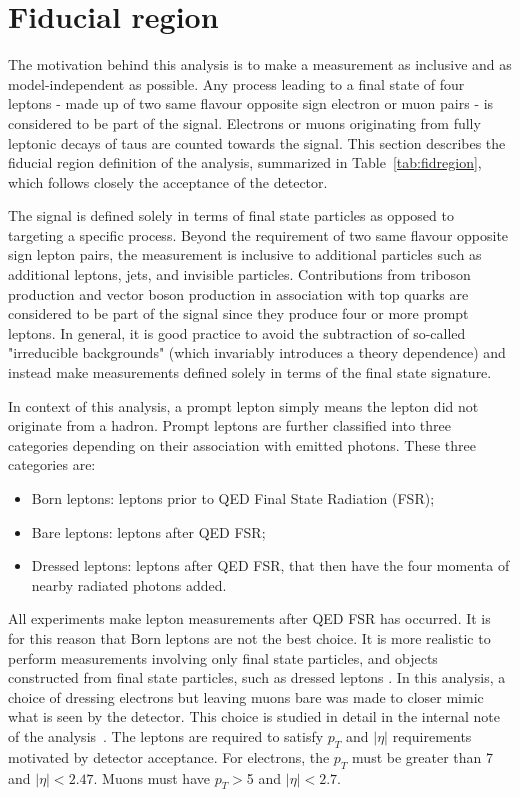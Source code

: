 \section{Fiducial region}
\label{sec:signaldef}
The motivation behind this analysis is to make a measurement as inclusive and as model-independent as possible. Any process leading to a final state of four leptons - made up of two same flavour opposite sign electron or muon pairs - is considered to be part of the signal. Electrons or muons originating from fully leptonic decays of taus are counted towards the signal. This section describes the fiducial region definition of the analysis, summarized in Table~\ref{tab:fidregion}, which follows closely the acceptance of the detector. 

The signal is defined solely in terms of final state particles as opposed to targeting a specific process. Beyond the requirement of two same flavour opposite sign lepton pairs, the measurement is inclusive to additional particles such as additional leptons, jets, and invisible particles. Contributions from triboson production and vector boson production in association with top quarks are considered to be part of the signal since they produce four or more prompt leptons. In general, it is good practice to avoid the subtraction of so-called "irreducible backgrounds" (which invariably introduces a theory dependence) and instead make measurements defined solely in terms of the final state signature. 

In context of this analysis, a prompt lepton simply means the lepton did not originate from a hadron. Prompt leptons are further classified into three categories depending on their association with emitted photons. These three categories are:
\begin{itemize}
    \item Born leptons: leptons prior to QED Final State Radiation (FSR);
    \item Bare leptons: leptons after QED FSR;
    \item Dressed leptons: leptons after QED FSR, that then have the four momenta of nearby radiated photons added. 
\end{itemize}
All experiments make lepton measurements after QED FSR has occurred. It is for this reason that Born leptons are not the best choice. It is more realistic to perform measurements involving only final state particles, and objects constructed from final state particles, such as dressed leptons \cite{Kar:ab1be6}. In this analysis, a choice of dressing electrons but leaving muons bare was made to closer mimic what is seen by the detector. This choice is studied in detail in the internal note of the analysis~\cite{m4l_internalnote}. The leptons are required to satisfy $p_T$ and $|\eta|$ requirements motivated by detector acceptance. For electrons, the $p_T$ must be greater than \unit{7}{\GeV} and $|\eta|<2.47$. Muons must have $p_T > $\unit{5}{\GeV} and $|\eta|<2.7$.

